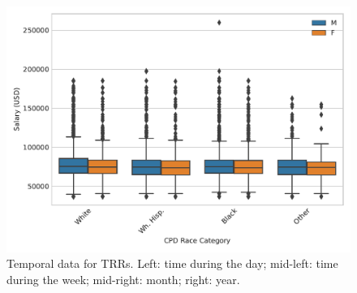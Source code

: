 \begin{figure}[h] 
	\includegraphics[width=\textwidth]{figs/salary_by_race_gender} 
	\caption{Temporal data for TRRs. Left: time during the day; mid-left: time during the week; mid-right: month; right: year.} \label{fig:trrs_times}
\end{figure}


